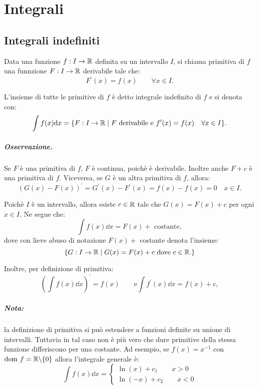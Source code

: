 
\chapter{Integrali} %

\label{ch:integrali} %


\section{Integrali indefiniti}
Data una funzione $f:I\rightarrow\mathbb{R}$ definita su un intervallo $I$, si chiama primitiva di $f$ una funnzione $F:I\rightarrow\mathbb{R}$ derivabile tale che:
\[F^\prime(x)=f(x) \qquad \forall x\in I.\]

L'insieme di tutte le primitive di $f$ è detto integrale indefinito di $f$ e si denota con:
\[\int f(x) \mathrm{d} x = \{F:I\rightarrow\mathbb{R} \mid F \text{ derivabile e } f^\prime(x)=f(x) \quad \forall x\in I\}.\]

\paragraph{Osservazione.} Se $F$ è una primitiva di $f$, $F$ è continua, poichè è derivabile.
Inoltre anche $F+c$ è una primitiva di $f$.
Viceversa, se $G$ è un altra primitiva di $f$, allora:
\[(G(x)-F(x))^\prime=G^\prime(x)-F^\prime(x)=f(x)-f(x)=0 \quad x\in I.\]

Poichè $I$ è un intervallo, allora esiste $c \in \mathbb{R}$ tale che $G(x)=F(x)+c$ per ogni $x\in I$.
Ne segue che:
\[\int f(x)\dd x=F(x)+\text{ costante},\]
dove con lieve abuso di notazione $F(x) +$ costante denota l'insieme:
\[\{G:I\rightarrow\mathbb{R}\mid G(x)=F(x)+c\text{ dove } c \in\mathbb{R} .\}\]

Inoltre, per definizione di primitiva:
\[\left(\int f(x)\dd x \right)^\prime=f(x) \qquad \text{e} \int f^\prime(x)\dd x = f(x) + c,\]

\paragraph{Nota:} la definizione di primitiva si può estendere a funzioni definite su unione di intervalli. Tuttavia in tal caso non è più vero che dure primitive della stessa funzione differiscono per una costante.
Ad esempio, se $f(x)=x^{-1}$ con $\text{dom } f=\mathbb{R} \backslash \{0\}$ allora l'integrale generale è:
\[\int f(x) \dd x = \begin{cases}
\ln(x)+c_1 \qquad x>0 \\
\ln(-x)+c_2 \qquad x<0
\end{cases}\]

